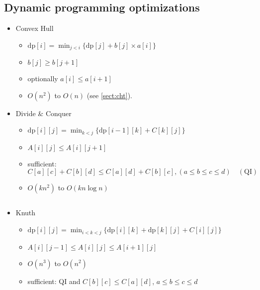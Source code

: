 \documentclass[9pt,a4paper,landscape,oneside]{amsart}
\newcommand{\mintedstyle}[2]{\inputminted{#1}{code/#2}}
\newcommand{\code}[1]{\mintedstyle{cpp}{#1}}
\newenvironment{myitemize}
{\begin{itemize}[leftmargin=.3cm]
	\setlength{\itemsep}{0pt}
	\setlength{\parskip}{0pt}
	\setlength{\parsep}{0pt}     }
{ \end{itemize}                  }
\begin{document}
\begin{multicols*}{3}
\subsection{Dynamic programming optimizations}
\begin{myitemize}
	\item Convex Hull
		\begin{myitemize}
			\item $\mathrm{dp}[i] = \min_{j<i}\{\mathrm{dp}[j] + b[j] \times a[i]\}$
			\item $b[j] \geq b[j+1]$
			\item optionally $a[i] \leq a[i+1]$
			\item $O(n^2)$ to $O(n)$ (see \ref{sect:cht}).
		\end{myitemize}
	\item Divide \& Conquer
		\begin{myitemize}
			\item $\mathrm{dp}[i][j] = \min_{k<j}\{\mathrm{dp}[i-1][k] + C[k][j]\}$
			\item $A[i][j] \leq A[i][j+1]$
			\item sufficient:
				\[ C[a][c] + C[b][d] \leq C[a][d] + C[b][c], (a\leq b\leq c\leq d) \quad (\text{QI}) \]
			\item $O(kn^2)$ to $O(kn\log{n})$
		\end{myitemize}
		\code{divco.cpp}
	\item Knuth
		\begin{myitemize}
			\item $\mathrm{dp}[i][j] = \min_{i<k<j}\{\mathrm{dp}[i][k] + \mathrm{dp}[k][j] + C[i][j]\}$
			\item $A[i][j-1] \leq A[i][j] \leq A[i+1][j]$
			\item $O(n^3)$ to $O(n^2)$
			\item sufficient: QI and $C[b][c] \leq C[a][d]$, $a\leq b\leq c\leq d$
		\end{myitemize}
\end{myitemize}


\end{multicols*}
\end{document}
